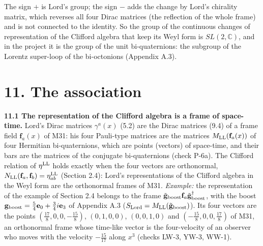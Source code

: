 \documentclass[
  10pt,
]{article}
\begin{document}
The sign \(+\) is Lord's group; the sign \(-\) adds the change by Lord's
chirality matrix, which reverses all four Dirac matrices (the reflection
of the whole frame) and is not connected to the identity. So the group
of the continuous changes of representation of the Clifford algebra that
keep its Weyl form is \(SL(2,\mathbb C)\), and in the project it is the
group of the unit bi-quaternions: the subgroup of the Lorentz super-loop
of the bi-octonions (Appendix A.3).

\hypertarget{the-association}{%
\section{11. The association}\label{the-association}}

\textbf{11.1 The representation of the Clifford algebra is a frame of
space-time.} Lord's Dirac matrices \(\gamma^a(x)\) (5.2) are the Dirac
matrices (9.4) of a frame field \(\mathbf f_a(x)\) of M31: his four
Pauli-type matrices are the matrices \(M_{\rm LL}(\mathbf f_a(x))\) of
four Hermitian bi-quaternions, which are points (vectors) of space-time,
and their bars are the matrices of the conjugate bi-quaternions (check
P-6a). The Clifford relation of \(\eta^{\rm LL}\) holds exactly when the
four vectors are orthonormal,
\(N_{\rm LL}(\mathbf f_a,\mathbf f_b)=\eta^{\rm LL}_{ab}\) (Section
2.4): Lord's representations of the Clifford algebra in the Weyl form
are the orthonormal frames of M31. \emph{Example:} the representation of
the example of Section 2.4 belongs to the frame
\(\tilde{\mathbf g}_{\rm boost}\mathbf f_a\tilde{\mathbf g}_{\rm boost}^\dagger\),
with the boost
\(\mathbf g_{\rm boost}=\tfrac{5}{4}\mathbf e_{0}+\tfrac{3}{4}i\mathbf e_{3}\)
of Appendix A.3
(\(S_{\rm Lord}=M_{\rm LL}(\tilde{\mathbf g}_{\rm boost})\)). Its four
vectors are the points \((\tfrac{17}{8},0,0,-\tfrac{15}{8})\),
\((0,1,0,0)\), \((0,0,1,0)\) and \((-\tfrac{15}{8},0,0,\tfrac{17}{8})\)
of M31, an orthonormal frame whose time-like vector is the four-velocity
of an observer who moves with the velocity \(-\tfrac{15}{17}\) along
\(x^3\) (checks LW-3, YW-3, WW-1).
\end{document}
